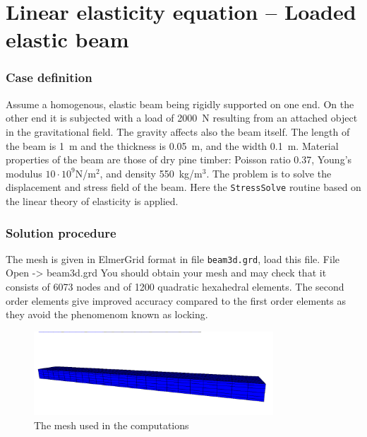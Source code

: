 \chapter{Linear elasticity equation -- Loaded elastic beam}


\subsection*{Case definition}

Assume a homogenous, elastic beam being rigidly supported on one 
end. On the other end it is subjected with a load of 2000~N
resulting from an attached object in the gravitational field. The gravity affects also the beam itself.
The length of the beam is 1~m and the thickness is 0.05~m, and the width 
0.1~m.
Material properties of the beam are those of dry pine timber:
Poisson 
ratio 0.37, Young's modulus $10\cdot 10^9$N/m$^2$, and density 550~kg/m$^3$. 
The problem is to solve the displacement and stress field of the beam.  
Here the \texttt{StressSolve} routine based on the 
linear theory of elasticity is applied.


\subsection*{Solution procedure}

The mesh is given in ElmerGrid format in file \texttt{beam3d.grd}, load this file.
\ttbegin
File 
  Open -> beam3d.grd
\ttend
You should obtain your mesh and may check that it consists of 6073 nodes and of 
1200 quadratic hexahedral elements. The second order elements give
improved accuracy compared to the first order elements as they avoid the phenomenom known as locking.
\begin{figure}[h!]
\begin{center}
  \includegraphics[width=0.8\textwidth,viewport=0 0 1230 300,clip]{beam_mesh}
  \caption{The mesh used in the computations}
  \label{fig:elast_mesh}
\end{center}
\end{figure}

